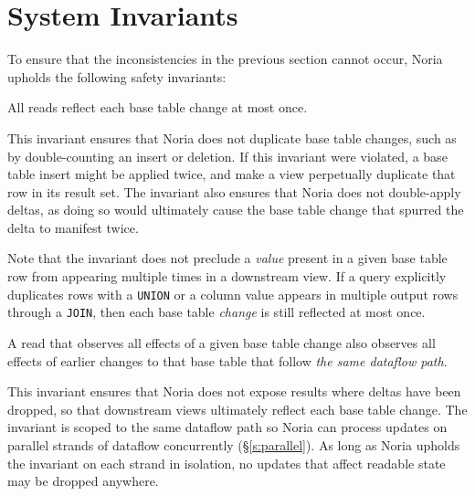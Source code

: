 \section{System Invariants}
\label{s:invariants}

To ensure that the inconsistencies in the previous section cannot occur, Noria
upholds the following safety invariants:

\begin{invariant}
  \label{i:no-spurious}
  All reads reflect each base table change at most once.
\end{invariant}

This invariant ensures that Noria does not duplicate base table changes, such as
by double-counting an insert or deletion. If this invariant were violated, a
base table insert might be applied twice, and make a view perpetually duplicate
that row in its result set. The invariant also ensures that Noria does not
double-apply deltas, as doing so would ultimately cause the base table change
that spurred the delta to manifest twice.

Note that the invariant does not preclude a \emph{value} present in a given base
table row from appearing multiple times in a downstream view. If a query
explicitly duplicates rows with a \texttt{UNION} or a column value appears in
multiple output rows through a \texttt{JOIN}, then each base table \emph{change}
is still reflected at most once.


\begin{invariant}
  \label{i:no-holes}
  A read that observes all effects of a given base table change also observes
  all effects of earlier changes to that base table that follow \emph{the same
  dataflow path}.
\end{invariant}

This invariant ensures that Noria does not expose results where deltas have been
dropped, so that downstream views ultimately reflect each base table change. The
invariant is scoped to the same dataflow path so Noria can process updates on
parallel strands of dataflow concurrently (\S\ref{s:parallel}). As long as Noria
upholds the invariant on each strand in isolation, no updates that affect
readable state may be dropped anywhere.

